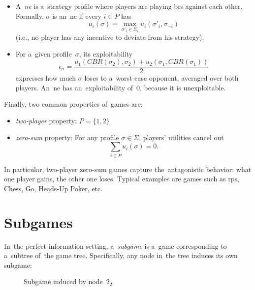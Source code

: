 \begin{itemize}
  \item A~\emph{\acrfull{ne}} is a~strategy profile where players are playing \acrlong{br}s against each other.
    Formally, $\sigma$ is an~\acrshort{ne} if every $i \in P$ has
    \[
      u_i (\sigma) = \max _{\sigma'_i \in \Sigma_i} u_i(\sigma'_i, \sigma_{-i})
    \]
    (i.e., no player has any incentive to deviate from his strategy).

  \item For a~given profile~$\sigma$, its exploitability
    \[
      \epsilon_\sigma = \frac{u_1(CBR(\sigma_2), \sigma_2) + u_2(\sigma_1, CBR(\sigma_1))} {2}
    \]
    expresses how much $\sigma$ loses to a~worst-case opponent, averaged over both players.
    An~\acrshort{ne} has an~exploitability of~$0$, because it is unexploitable.
\end{itemize}

Finally, two common properties of~games are:
\begin{itemize}
  \item \emph{two-player} property: $P = \{1, 2\}$
  \item \emph{zero-sum} property:
    For any profile $\sigma \in \Sigma$, players' utilities cancel out
    \[
      \sum _{i \in P} u _i (\sigma) = 0.
    \]
\end{itemize}
In particular, two-player zero-sum games capture the~antagonistic behavior:
what one player gains, the other one loses.
Typical examples are games such as \acrshort{rps}, Chess, Go, Heads-Up Poker, etc.

\section{Subgames}
In~the perfect-information setting, a~\emph{subgame} is a~game corresponding to a~subtree of~the game tree.
Specifically, any node in~the tree induces its own subgame:
\begin{figure}[H]
  \centering
  \scriptsize
  \def\svgwidth{.8\textwidth}
  
  \def\captionTitle{Subgame induced by node~$2_2$}
  \caption[\captionTitle]{\captionTitle{}}
  \label{fig:ext-form-subgame}
\end{figure}


